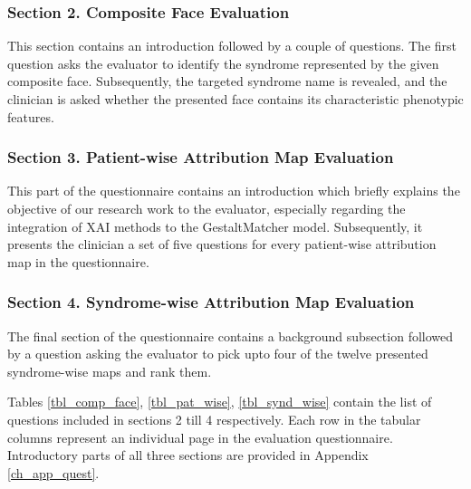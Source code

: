 \documentclass[../report.tex]{subfiles}
\begin{document}
    
   \subsubsection{Section 2. Composite Face Evaluation}
   This section contains an introduction followed by a couple of questions. The first question asks the evaluator to identify the syndrome represented by the given composite face. Subsequently, the targeted syndrome name is revealed, and the clinician is asked whether the presented face contains its characteristic phenotypic features.
    
   \subsubsection{Section 3. Patient-wise Attribution Map Evaluation}
   \raggedbottom
   This part of the questionnaire contains an introduction which briefly explains the objective of our research work to the evaluator, especially regarding the integration of XAI methods to the GestaltMatcher model. Subsequently, it presents the clinician a set of five questions for every patient-wise attribution map in the questionnaire.
   \subsubsection{Section 4. Syndrome-wise Attribution Map Evaluation}
   The final section of the questionnaire contains a background subsection followed by a question asking the evaluator to pick upto four of the twelve presented syndrome-wise maps and rank them.
   
   Tables \ref{tbl_comp_face}, \ref{tbl_pat_wise}, \ref{tbl_synd_wise} contain the list of questions included in sections 2 till 4 respectively. Each row in the tabular columns represent an individual page in the evaluation questionnaire. Introductory parts of all three sections are provided in Appendix \ref{ch_app_quest}.
  
\end{document}
